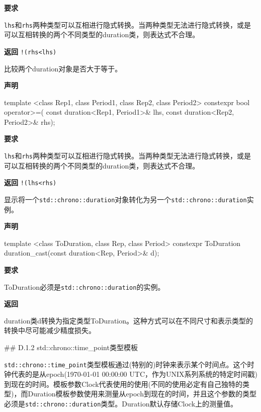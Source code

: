 \textbf{要求}

\texttt{lhs}和\texttt{rhs}两种类型可以互相进行隐式转换。当两种类型无法进行隐式转换，或是可以互相转换的两个不同类型的duration类，则表达式不合理。

\textbf{返回}
\texttt{!(rhs<lhs)}


比较两个duration对象是否大于等于。

\textbf{声明}

\begin{cpp}
template <class Rep1, class Period1, class Rep2, class Period2>
constexpr bool operator>=(
   const duration<Rep1, Period1>& lhs,
   const duration<Rep2, Period2>& rhs);
\end{cpp}

\textbf{要求}

\texttt{lhs}和\texttt{rhs}两种类型可以互相进行隐式转换。当两种类型无法进行隐式转换，或是可以互相转换的两个不同类型的duration类，则表达式不合理。

\textbf{返回}
\texttt{!(lhs<rhs)}


显示将一个\texttt{std::chrono::duration}对象转化为另一个\texttt{std::chrono::duration}实例。

\textbf{声明}

\begin{cpp}
template <class ToDuration, class Rep, class Period>
constexpr ToDuration duration_cast(const duration<Rep, Period>& d);
\end{cpp}

\textbf{要求}

ToDuration必须是\texttt{std::chrono::duration}的实例。

\textbf{返回}

duration类d转换为指定类型ToDuration。这种方式可以在不同尺寸和表示类型的转换中尽可能减少精度损失。

## D.1.2 std::chrono::time\_point类型模板

\texttt{std::chrono::time\_point}类型模板通过(特别的)时钟来表示某个时间点。这个时钟代表的是从epoch(1970-01-01 00:00:00 UTC，作为UNIX系列系统的特定时间戳)到现在的时间。模板参数Clock代表使用的使用(不同的使用必定有自己独特的类型)，而Duration模板参数使用来测量从epoch到现在的时间，并且这个参数的类型必须是\texttt{std::chrono::duration}类型。Duration默认存储Clock上的测量值。


